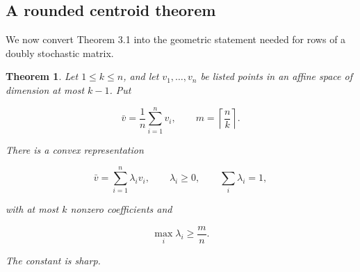 \documentclass[11pt]{article}
\newtheorem{theorem}{Theorem}[section]
\theoremstyle{remark}
\begin{document}
\subsection{A rounded centroid theorem}

We now convert Theorem 3.1 into the geometric statement needed for rows of a
doubly stochastic matrix.

\begin{theorem}
Let \(1\leq k\leq n\), and let
\(v_1,\ldots,v_n\) be listed points in an affine space of dimension at most
\(k-1\). Put

\[
 \bar v=\frac1n\sum_{i=1}^n v_i,
 \qquad
 m=\left\lceil\frac nk\right\rceil.
\]

There is a convex representation

\[
 \bar v=\sum_{i=1}^n\lambda_i v_i,
 \qquad
 \lambda_i\geq0,
 \qquad
 \sum_i\lambda_i=1,                                       \tag{3.7}
\]

with at most \(k\) nonzero coefficients and

\[
 \boxed{\max_i\lambda_i\geq\frac mn.}                     \tag{3.8}
\]

The constant is sharp.
\end{theorem}
\end{document}
